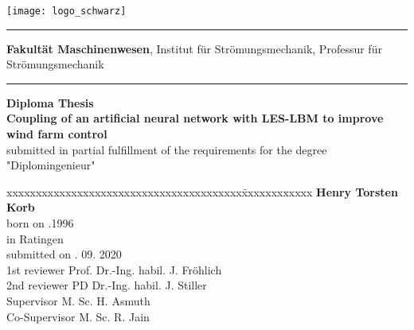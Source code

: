 \begin{titlepage}
\addtolength{\topmargin}{-1.5cm}
\hspace{-2.1cm} \texttt{[image: logo\_schwarz]}
\vspace{0.5cm}
\hrule 
\vspace{0.05cm}
\small\textbf{Fakultät Maschinenwesen},
Institut für Strömungsmechanik,
Professur für Strömungsmechanik
\vspace{0.1cm}
\hrule 
\vspace{4cm}
\textbf{\Large Diploma Thesis}\\

\vspace{1.5cm}
%
\textbf{\LARGE Coupling of an artificial neural network with LES-LBM to improve wind farm control}\\[1.5cm]
%
\normalsize
submitted in partial fulfillment of the requirements for the degree "Diplomingenieur"\\[2.5cm]
\begin{tabbing}
	xxxxxxxxxxxxxxxxxxxxxxxxxxxxxxxxxxxxxxxx\=xxxxxxxxxxxx\kill
					\>  \textbf{Henry Torsten Korb}\\
	born on			.1996\\
	in				\>	Ratingen \\[0.1cm]
	submitted on	. 09. 2020 \\[0.5cm]
	1st reviewer	\>  Prof. Dr.-Ing. habil. J. Fröhlich	\\
	2nd reviewer	\>	PD Dr.-Ing. habil. J. Stiller \\
	Supervisor		\>  M. Sc. H. Asmuth \\
	Co-Supervisor	\>  M. Sc. R. Jain 
\end{tabbing}
\cleardoublepage
\end{titlepage}
